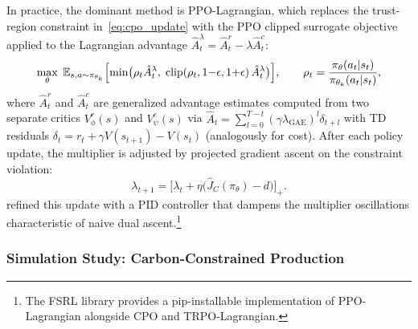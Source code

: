 In practice, the dominant method is PPO-Lagrangian, which replaces the
trust-region constraint in~\eqref{eq:cpo_update} with the PPO clipped
surrogate objective applied to the Lagrangian advantage
$\hat{A}^\lambda_t = \hat{A}^r_t - \lambda \hat{A}^c_t$:
\begin{equation}
  \max_\theta \; \mathbb{E}_{s,a \sim \pi_{\theta_k}}
  \Bigl[\min\bigl(
    \rho_t \hat{A}^\lambda_t,\;
    \mathrm{clip}(\rho_t, 1{-}\epsilon, 1{+}\epsilon)\,\hat{A}^\lambda_t
  \bigr)\Bigr],
  \qquad
  \rho_t = \frac{\pi_\theta(a_t|s_t)}{\pi_{\theta_k}(a_t|s_t)},
  \label{eq:ppo_lag_objective}
\end{equation}
where $\hat{A}^r_t$ and $\hat{A}^c_t$ are generalized advantage estimates
computed from two separate critics $V^r_\phi(s)$ and $V^c_\psi(s)$ via
$\hat{A}_t = \sum_{l=0}^{T-t}(\gamma\lambda_{\mathrm{GAE}})^l \delta_{t+l}$
with TD residuals
$\delta_t = r_t + \gamma V(s_{t+1}) - V(s_t)$ (analogously for cost).
After each policy update, the multiplier is adjusted by
projected gradient ascent on the constraint violation:
\begin{equation}
  \lambda_{t+1}
  = \bigl[\lambda_t + \eta\bigl(\hat{J}_C(\pi_\theta) - d\bigr)\bigr]_+.
  \label{eq:dual_update}
\end{equation}
\citet{Stooke2020} refined this update with a PID controller that dampens the multiplier oscillations characteristic of naive dual
ascent.\footnote{The FSRL library \citep{Liu2024fsrl} provides a
pip-installable implementation of PPO-Lagrangian alongside CPO and
TRPO-Lagrangian.}


\subsubsection{Simulation Study: Carbon-Constrained Production}
\label{subsec:sim_carbon_production}


